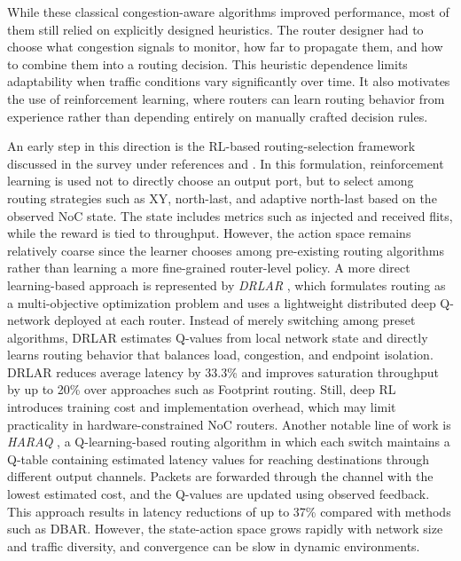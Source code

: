 While these classical congestion-aware algorithms improved performance, most of them still relied on explicitly designed heuristics. The router designer had to choose what congestion signals to monitor, how far to propagate them, and how to combine them into a routing decision. This heuristic dependence limits adaptability when traffic conditions vary significantly over time. It also motivates the use of reinforcement learning, where routers can learn routing behavior from experience rather than depending entirely on manually crafted decision rules.

An early step in this direction is the RL-based routing-selection framework discussed in the survey under references \cite{DBLP:journals/corr/abs-1908-04484} and \cite{Reza2021}. In this formulation, reinforcement learning is used not to directly choose an output port, but to select among routing strategies such as XY, north-last, and adaptive north-last based on the observed NoC state. The state includes metrics such as injected and received flits, while the reward is tied to throughput. However, the action space remains relatively coarse since the learner chooses among pre-existing routing algorithms rather than learning a more fine-grained router-level policy. A more direct learning-based approach is represented by \textit{DRLAR} \cite{WANG2024110419}, which formulates routing as a multi-objective optimization problem and uses a lightweight distributed deep Q-network deployed at each router. Instead of merely switching among preset algorithms, DRLAR estimates Q-values from local network state and directly learns routing behavior that balances load, congestion, and endpoint isolation. DRLAR reduces average latency by 33.3\% and improves saturation throughput by up to 20\% over approaches such as Footprint routing. Still, deep RL introduces training cost and implementation overhead, which may limit practicality in hardware-constrained NoC routers. Another notable line of work is \textit{HARAQ} \cite{Ebrahimi2012}, a Q-learning-based routing algorithm in which each switch maintains a Q-table containing estimated latency values for reaching destinations through different output channels. Packets are forwarded through the channel with the lowest estimated cost, and the Q-values are updated using observed feedback. This approach results in latency reductions of up to 37\% compared with methods such as DBAR. However, the state-action space grows rapidly with network size and traffic diversity, and convergence can be slow in dynamic environments.


